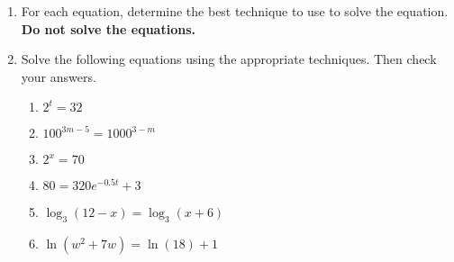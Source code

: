 \clearpage

\begin{enumerate}

\item  For each equation, determine the best
  technique to use to solve the equation.  \textbf{Do not solve the
    equations.}
\begin{enumerate}
\end{enumerate}


\item Solve the following equations using the appropriate techniques.
  Then check your answers.
\begin{enumerate}

\item $2^t=32$
  \vfill

\item $100^{3m-5}=1000^{3-m}$
\vfill

\clearpage
\item $2^x=70$
\vfill
\item $80=320e^{-0.5t}+3$
\vfill

\item $\log_3(12-x)=\log_3(x+6)$
\vfill

\item $\ln(w^2+7w)=\ln(18)+1$
\vfill


\end{enumerate}



\end{enumerate}
